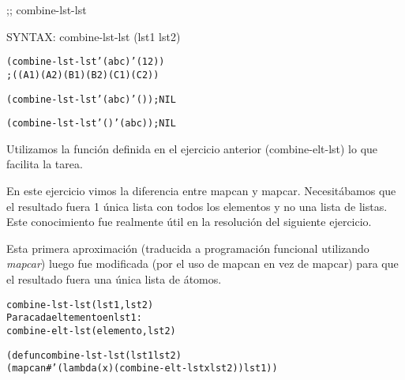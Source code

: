 \begin{aibox}{\function}
;; combine-lst-lst

SYNTAX: combine-lst-lst (lst1 lst2)
\end{aibox}

\begin{aibox}{\examples}
\begin{alltt}
(combine-lst-lst '(a b c) '(1 2))
; ((A 1) (A 2) (B 1) (B 2) (C 1) (C 2))

(combine-lst-lst '(a b c) '()); NIL

(combine-lst-lst '() '(a b c)); NIL
\end{alltt}

\end{aibox}

\begin{aibox}{\comments}
Utilizamos la función definida en el ejercicio anterior (combine-elt-lst) lo que facilita la tarea.

En este ejercicio vimos la diferencia entre mapcan y mapcar. Necesitábamos que el resultado fuera 1 única lista con todos los elementos y no una lista de listas. Este conocimiento fue realmente útil en la resolución del siguiente ejercicio.
\end{aibox}
\begin{aibox}{\pseudocode}
Esta primera aproximación (traducida a programación funcional utilizando \emph{mapcar}) luego fue modificada (por el uso de mapcan en vez de mapcar) para que el resultado fuera una única lista de átomos.
\begin{alltt}
combine-lst-lst (lst1,lst2)
    Para cada eltemento en lst1:
        combine-elt-lst (elemento,lst2)
\end{alltt}
\end{aibox}
\begin{aibox}{\code}

\begin{alltt}

(defun combine-lst-lst (lst1 lst2)
            (mapcan #'(lambda (x) (combine-elt-lst x lst2)) lst1))

\end{alltt}
\end{aibox}
